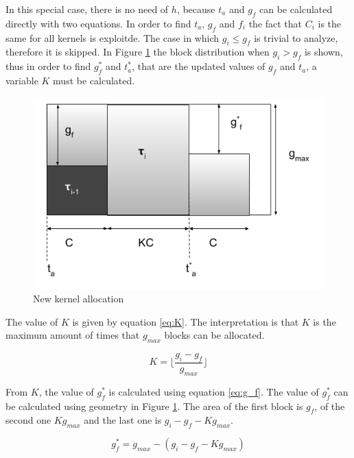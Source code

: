 \documentclass[
  12pt,
  a4paperpaper,
]{report}
\begin{document}
In this special case, there is no need of \(h\), because \(t_a\) and
\(g_f\) can be calculated directly with two equations.
In order to find \(t_a\), \(g_f\) and \(f_i\) the fact that \(C_i\) is the same for all kernels is exploitde. 
The case in which \(g_i \leq g_f\) is trivial to analyze, therefore it is skipped.
In Figure \ref{img:free_blocks_alg} the block
distribution when \(g_i > g_f\) is shown, thus in order to find \(g^{*}_f\) and
\(t^{*}_a\), that are the updated values of \(g_f\) and \(t_a\), a variable \(K\) must be calculated.

\begin{figure}
\centering
\includegraphics{source/figures/free_blocks_alg.png}
\caption{New kernel allocation \label{img:free_blocks_alg}}
\end{figure}

The value of \(K\) is given by equation \ref{eq:K}. The
interpretation is that \(K\) is the maximum amount of times that
\(g_{max}\) blocks can be allocated.

\begin{equation}
K = \lfloor \frac{g_i - g_f}{g_{max}} \rfloor
\label{eq:K}
\end{equation}

From \(K\), the value of \(g^{*}_f\) is calculated using equation \ref{eq:g_f}. 
The value of \(g^{*}_f\) can be calculated using geometry in Figure \ref{img:free_blocks_alg}.
The area of the first block is \(g_f\), of the second one \(Kg_{max}\) and the last one is \(g_i - g_f - K g_{max}\).

\begin{equation}
g^{*}_f = g_{max} - (g_i -  g_f - K g_{max} )
\label{eq:g_f}
\end{equation}
\end{document}

